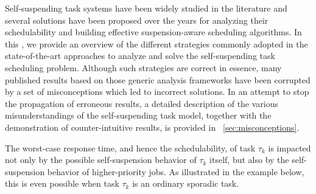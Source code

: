 
\label{sec:review}

Self-suspending task systems have been widely studied in the literature and several solutions have been proposed over the years for 
analyzing their schedulability and building effective suspension-aware scheduling algorithms. In this \mysectionrefnormal{}, we provide an overview of the different 
strategies commonly adopted in the state-of-the-art approaches to analyze and solve the self-suspending task scheduling problem. Although such strategies are
correct in essence, many published results based on those generic analysis frameworks have been corrupted by a set of 
misconceptions which led to incorrect solutions. In an attempt to stop the propagation of erroneous results, a detailed 
description of the various misunderstandings of the self-suspending task model, together with the demonstration of 
counter-intuitive results, is provided in \mysectionref{}~\ref{sec:misconceptions}.

The worst-case response time, and hence the schedulability, of task $\tau_k$ is impacted not only by 
the possible self-suspension behavior of $\tau_k$ itself, but also by
the self-suspension behavior of  higher-priority jobs. As illustrated
in the example below, this is even possible when task $\tau_k$ is an
ordinary sporadic task.


